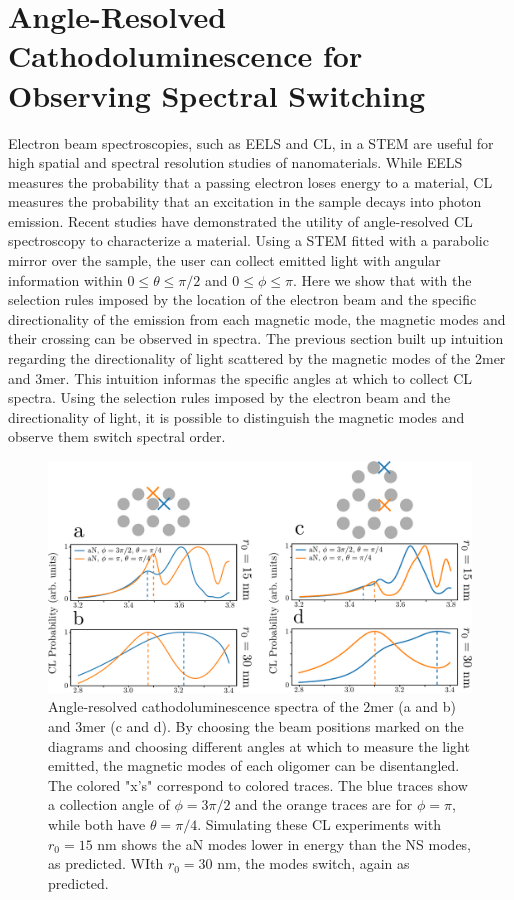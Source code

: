\documentclass[journal=apchd5,manuscript=article]{achemso}
\begin{document}
\section{Angle-Resolved Cathodoluminescence for Observing Spectral Switching}
Electron beam spectroscopies, such as EELS and CL, in a STEM are useful for high spatial and spectral resolution studies of nanomaterials\cite{Coenen2011,CoPol2011,Abajo2013,Polman2014,ARPC}. While EELS measures the probability that a passing electron loses energy to a material, CL measures the probability that an excitation in the sample decays into photon emission. Recent studies have demonstrated the utility of angle-resolved CL spectroscopy to characterize a material. Using a STEM fitted with a parabolic mirror over the sample, the user can collect emitted light with angular information within $0 \leq \theta \leq \pi/2$ and $0 \leq \phi \leq \pi$\cite{Coenen2011,CoPol2011,Polman2014}. Here we show that with the selection rules imposed by the location of the electron beam and the specific directionality of the emission from each magnetic mode, the magnetic modes and their crossing can be observed in spectra. The previous section built up intuition regarding the directionality of light scattered by the magnetic modes of the 2mer and 3mer. This intuition informas the specific angles at which to collect CL spectra. Using the selection rules imposed by the electron beam and the directionality of light, it is possible to distinguish the magnetic modes and observe them switch spectral order.

\begin{figure}
\includegraphics[width=6in]{CL_2mer_3mer.pdf}
\caption{Angle-resolved cathodoluminescence spectra of the 2mer (a and b) and 3mer (c and d). By choosing the beam positions marked on the diagrams and choosing different angles at which to measure the light emitted, the magnetic modes of each oligomer can be disentangled. The colored "x's" correspond to colored traces. The blue traces show a collection angle of $\phi = 3\pi/2$ and the orange traces are for $\phi = \pi$, while both have $\theta = \pi/4$. Simulating these CL experiments with $r_0 = 15$ nm shows the aN modes lower in energy than the NS modes, as predicted. WIth $r_0 = 30$ nm, the modes switch, again as predicted.}
\label{CL_2mer_3mer}
\end{figure}
\end{document}
